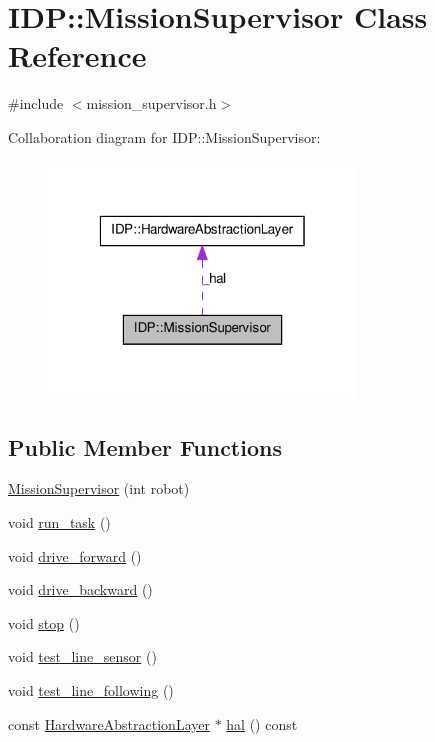 \hypertarget{classIDP_1_1MissionSupervisor}{
\section{IDP::MissionSupervisor Class Reference}
\label{classIDP_1_1MissionSupervisor}
}


{\ttfamily \#include $<$mission\_\-supervisor.h$>$}



Collaboration diagram for IDP::MissionSupervisor:\nopagebreak
\begin{figure}[H]
\begin{center}
\leavevmode
\includegraphics[width=232pt]{classIDP_1_1MissionSupervisor__coll__graph}
\end{center}
\end{figure}
\subsection*{Public Member Functions}
\begin{DoxyCompactItemize}
\item 
\hyperlink{classIDP_1_1MissionSupervisor_afc6a54e04718d919b2b48458a47304b2}{MissionSupervisor} (int robot)
\item 
void \hyperlink{classIDP_1_1MissionSupervisor_a06fc1fcf6272651d50938fd94306ac24}{run\_\-task} ()
\item 
void \hyperlink{classIDP_1_1MissionSupervisor_af8c6a3073190a4479211753fe5f50a36}{drive\_\-forward} ()
\item 
void \hyperlink{classIDP_1_1MissionSupervisor_ae5d6e9a37417126da780583349b48d44}{drive\_\-backward} ()
\item 
void \hyperlink{classIDP_1_1MissionSupervisor_ad11e444b6be1d51c3339bd6397d45fd4}{stop} ()
\item 
void \hyperlink{classIDP_1_1MissionSupervisor_af147b0bec9464bb7e956a40a7f3d0fda}{test\_\-line\_\-sensor} ()
\item 
void \hyperlink{classIDP_1_1MissionSupervisor_a21be0b52e2f13c7fb373c90dae77ba23}{test\_\-line\_\-following} ()
\item 
const \hyperlink{classIDP_1_1HardwareAbstractionLayer}{HardwareAbstractionLayer} $\ast$ \hyperlink{classIDP_1_1MissionSupervisor_ae19d0c2123fda158cc45e649128fbc09}{hal} () const 
\end{DoxyCompactItemize}


